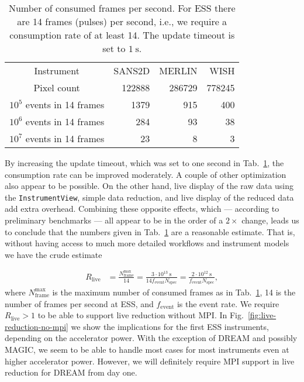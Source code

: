 \documentclass[a4paper,english,numbers=noenddot,bibliography=totoc,chapterprefix=on,DIV=12]{scrartcl}
\newcommand{\Nspec}{N_{\text{spec}}}
\newcommand{\Fevent}{f_{\text{event}}}
\newcommand{\dream}{DREAM\xspace}
\newcommand{\magic}{MAGIC\xspace}
\begin{document}
\begin{table}
  \centering
  \begin{tabular}{c|rrr}
    Instrument & SANS2D & MERLIN & WISH\\
    Pixel count & 122888 & 286729 & 778245\\
    \hline
    $10^5$ events in 14 frames & 1379 & 915 & 400 \\
    $10^6$ events in 14 frames & 284 & 93 & 38 \\
    $10^7$ events in 14 frames & 23 & 8 & 3 \\
  \end{tabular}
  \caption{\label{tab:consumption-rate}Number of consumed frames per second. For ESS there are 14 frames (pulses) per second, i.e., we require a consumption rate of at least 14. The update timeout is set to $1~\mathrm{s}$.}
\end{table}

By increasing the update timeout, which was set to one second in Tab.~\ref{tab:consumption-rate}, the consumption rate can be improved moderately.
A couple of other optimization also appear to be possible.
On the other hand, live display of the raw data using the \verb|InstrumentView|, simple data reduction, and live display of the reduced data add extra overhead.
Combining these opposite effects, which --- according to preliminary benchmarks --- all appear to be in the order of a $2\times$ change, leads us to conclude that the numbers given in Tab.~\ref{tab:consumption-rate} are a reasonable estimate.
That is, without having access to much more detailed workflows and instrument models we have the crude estimate

\begin{align}
  R_{\text{live}} &= \frac{N_{\text{frame}}^{\text{max}}}{14} = \frac{3\cdot10^{13}~\mathrm{s}}{14\Fevent\Nspec} = \frac{2\cdot10^{12}~\mathrm{s}}{\Fevent\Nspec},
\end{align}
where $N_{\text{frame}}^{\text{max}}$ is the maximum number of consumed frames as in Tab.~\ref{tab:consumption-rate}, 14 is the number of frames per second at ESS, and $\Fevent$ is the event rate.
We require $R_{\text{live}} > 1$ to be able to support live reduction without MPI.
In Fig.~\ref{fig:live-reduction-no-mpi} we show the implications for the first ESS instruments, depending on the accelerator power.
With the exception of \dream and possibly \magic, we seem to be able to handle most cases for most instruments even at higher accelerator power.
However, we will definitely require MPI support in live reduction for \dream from day one.
\end{document}
